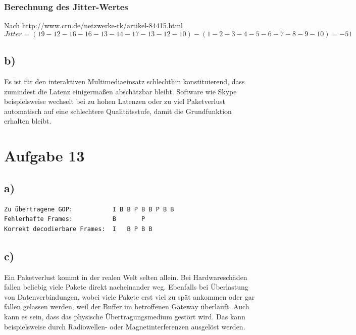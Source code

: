 \documentclass[a4paper,12pt]{scrartcl}
\begin{document}
\subsubsection{Berechnung des Jitter-Wertes}
Nach http://www.crn.de/netzwerke-tk/artikel-84415.html
\[Jitter = (19 - 12 - 16 - 16 - 13 - 14 - 17 - 13 - 12 - 10) - (1 - 2 - 3 - 4 - 5 - 6 - 7 - 8 - 9 - 10) = -51\]

\subsection{b)}
Es ist für den interaktiven Multimediaeinsatz schlechthin konstituierend, dass
zumindest die Latenz einigermaßen abschätzbar bleibt. Software wie Skype
beispielsweise wechselt bei zu hohen Latenzen oder zu viel Paketverlust
automatisch auf eine schlechtere Qualitätsstufe, damit die Grundfunktion erhalten
bleibt.

\newpage
\section{Aufgabe 13}
\subsection{a)}
\begin{verbatim}
Zu übertragene GOP:           I B B P B B P B B
Fehlerhafte Frames:           B       P
Korrekt decodierbare Frames:  I   B P B B
\end{verbatim}

\subsection{c)}
Ein Paketverlust kommt in der realen Welt selten allein. Bei Hardwareschäden
fallen beliebig viele Pakete direkt nacheinander weg. Ebenfalls bei
Überlastung von Datenverbindungen, wobei viele Pakete erst viel zu spät ankommen
oder gar fallen gelassen werden, weil der Buffer im betroffenen Gateway
überläuft. Auch kann es sein, dass das physische Übertragungsmedium gestört
wird. Das kann beispielsweise durch Radiowellen- oder Magnetinterferenzen
ausgelöst werden.
\end{document}
